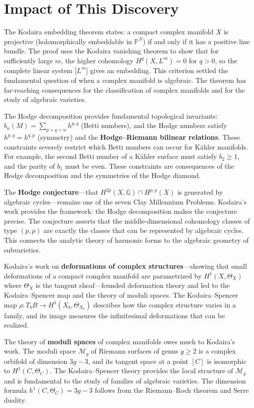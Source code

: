 \section{Impact of This Discovery}

The Kodaira embedding theorem states: a compact complex manifold $X$ is
projective (holomorphically embeddable in $\mathbb{P}^N$) if and only
if it has a positive line bundle. The proof uses the Kodaira vanishing
theorem to show that for sufficiently large $m$, the higher cohomology
$H^q(X, L^m) = 0$ for $q > 0$, so the complete linear system $|L^m|$
gives an embedding. This criterion settled the fundamental question of
when a complex manifold is algebraic. The theorem has far-reaching
consequences for the classification of complex manifolds and for the
study of algebraic varieties.

The Hodge decomposition provides fundamental topological invariants:
$b_n(M) = \sum_{p+q=n} h^{p,q}$ (Betti numbers), and the Hodge numbers
satisfy $h^{p,q} = h^{q,p}$ (symmetry) and the \textbf{Hodge--Riemann
bilinear relations}. These constraints severely restrict which Betti
numbers can occur for K{\"a}hler manifolds. For example, the second
Betti number of a K{\"a}hler surface must satisfy $b_2 \geq 1$, and the
parity of $b_1$ must be even. These constraints are consequences of the
Hodge decomposition and the symmetries of the Hodge diamond.

The \textbf{Hodge conjecture}---that $H^{2p}(X, \mathbb{Q}) \cap
H^{p,p}(X)$ is generated by algebraic cycles---remains one of the seven
Clay Millennium Problems. Kodaira's work provides the framework: the
Hodge decomposition makes the conjecture precise. The conjecture
asserts that the middle-dimensional cohomology classes of type $(p,p)$
are exactly the classes that can be represented by algebraic cycles.
This connects the analytic theory of harmonic forms to the algebraic
geometry of subvarieties.

Kodaira's work on \textbf{deformations of complex structures}---showing
that small deformations of a compact complex manifold are parametrized
by $H^1(X, \Theta_X)$ where $\Theta_X$ is the tangent sheaf---founded
deformation theory and led to the Kodaira--Spencer map and the theory of
moduli spaces. The Kodaira--Spencer map $\rho: T_b B \to H^1(X_b,
\Theta_{X_b})$ describes how the complex structure varies in a family,
and its image measures the infinitesimal deformations that can be
realized.

The theory of \textbf{moduli spaces} of complex manifolds owes much to
Kodaira's work. The moduli space $\mathcal{M}_g$ of Riemann surfaces of
genus $g \geq 2$ is a complex orbifold of dimension $3g-3$, and its
tangent space at a point $[C]$ is isomorphic to $H^1(C, \Theta_C)$. The
 Kodaira--Spencer theory provides the local structure of $\mathcal{M}_g$
and is fundamental to the study of families of algebraic varieties. The
dimension formula $h^1(C, \Theta_C) = 3g-3$ follows from the
Riemann--Roch theorem and Serre duality.

